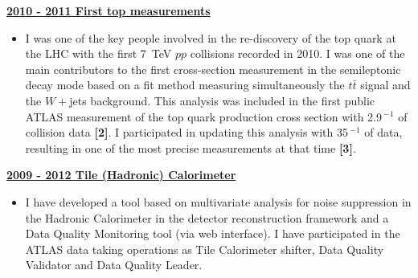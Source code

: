\documentclass[12pt]{article}
\begin{document}
 
{\bf \underline{2010 - 2011 First top measurements}}
\vskip 0.2cm
\begin{itemize}[leftmargin=1.3cm]
\itemsep0.8em
\item[] I was one of the key people involved in the re-discovery of the top quark at the LHC with the first 7~TeV $pp$ collisions recorded in 2010. I was one of the main contributors to the first cross-section measurement in the semileptonic decay mode based on a fit method measuring simultaneously the $t\bar{t}$ signal and the $W+$jets background. This analysis was included in the first public ATLAS measurement of the top quark production cross section with 2.9\,$^{-1}$ of collision data {\bf \color{red}[2]}.
I participated in updating this analysis with 35\,$^{-1}$ of data, resulting in one of the most precise measurements at that time {\bf \color{red}[3]}.
\end{itemize}
\vskip 0.4cm


{\bf \underline{2009 - 2012 Tile (Hadronic) Calorimeter}}
\vskip 0.2cm
\begin{itemize}[leftmargin=1.3cm]
\itemsep0.8em
\item[] 
I have developed a tool based on multivariate analysis for noise suppression in the Hadronic Calorimeter in the detector reconstruction framework and a Data Quality Monitoring tool (via web interface). I have participated in the ATLAS data taking operations as Tile Calorimeter shifter, Data Quality Validator and Data Quality Leader.
\end{itemize}
\vskip 0.4cm
\end{document}
